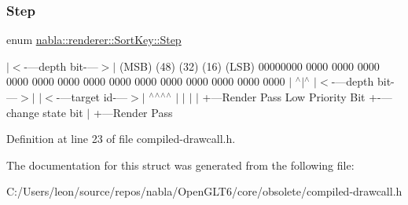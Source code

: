 \subsubsection{\texorpdfstring{Step}{Step}\hspace{0.1cm}{\footnotesize\ttfamily [2/2]}}
{\footnotesize\ttfamily enum \mbox{\hyperlink{structnabla_1_1renderer_1_1_sort_key_ae0121b7c60133bb8c0bf82785307f53a}{nabla\+::renderer\+::\+Sort\+Key\+::\+Step}}}

$\vert$$<$-\/---depth bit-\/---$>$$\vert$ (M\+SB) (48) (32) (16) (L\+SB) 00000000 0000 0000 0000 0000 0000 0000 0000 0000 0000 0000 0000 0000 0000 0000 $\vert$ $^\wedge$$\vert$$^\wedge$ $\vert$$<$-\/---depth bit-\/---$>$$\vert$ $\vert$$<$-\/---target id-\/---$>$$\vert$ $^\wedge$$^\wedge$$^\wedge$$^\wedge$ $\vert$ $\vert$ $\vert$ $\vert$ +---Render Pass Low Priority Bit +-\/--- change state bit $\vert$ +---Render Pass 

Definition at line 23 of file compiled-\/drawcall.\+h.



The documentation for this struct was generated from the following file\+:\begin{DoxyCompactItemize}
\item 
C\+:/\+Users/leon/source/repos/nabla/\+Open\+G\+L\+T6/core/obsolete/compiled-\/drawcall.\+h\end{DoxyCompactItemize}
